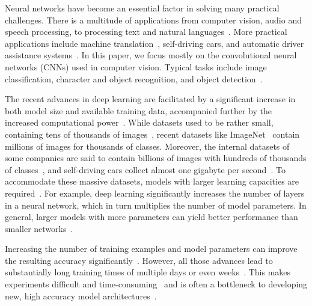 \documentclass[conference]{IEEEtran}
\begin{document}
Neural networks have become an essential factor in solving many practical challenges.
There is a multitude of applications from computer vision, audio and speech processing, to processing text and natural languages~\cite{chen2016-Revisiting-distributed-synchronous-SGD,dean2012-Large-scale-distributed,yadan2013-Multi-GPU-Training}.
More practical applications include machine translation~\cite{sutskever2014sequence}, self-driving cars, and automatic driver assistance systems~\cite{jin2016-How-to-scale}.
%
In this paper, we focus mostly on the convolutional neural networks (CNNs) used in computer vision.
Typical tasks include image classification, character and object recognition, and object detection~\cite{paine2013-GPU-async-SGD}.


The recent advances in deep learning are facilitated by a significant increase in both model size and available training data, accompanied further by the increased computational power~\cite{chen2016-Revisiting-distributed-synchronous-SGD,chilimbi2014-Project-Adam}.
%
While datasets used to be rather small, containing tens of thousands of images~\cite{lecun1998gradient,krizhevsky2009CIFAR10}, recent datasets like ImageNet~\cite{imagenet_cvpr09} contain millions of images for thousands of classes.
Moreover, the internal datasets of some companies are said to contain billions of images with hundreds of thousands of classes~\cite{iandola2016-Firecaffe}, and self-driving cars collect almost one gigabyte per second~\cite{jin2016-How-to-scale}.
%
To accommodate these massive datasets, models with larger learning capacities are required~\cite{krizhevsky2012-AlexNet}.
For example, deep learning significantly increases the number of layers in a neural network, which in turn multiplies the number of model parameters.
In general, larger models with more parameters can yield better performance than smaller networks~\cite{coates2013-DL-COTS-HPC,dean2012-Large-scale-distributed,krizhevsky2012-AlexNet}.


Increasing the number of training examples and model parameters can improve the resulting accuracy significantly~\cite{dean2012-Large-scale-distributed}.
However, all those advances lead to substantially long training times of multiple days or even weeks~\cite{jin2016-How-to-scale,chilimbi2014-Project-Adam,sergeev2018horovod}.
This makes experiments difficult and time-consuming~\cite{yadan2013-Multi-GPU-Training,jiang2018-FiLayer} and is often a bottleneck to developing new, high accuracy model architectures~\cite{iandola2016-Firecaffe}.
\end{document}
